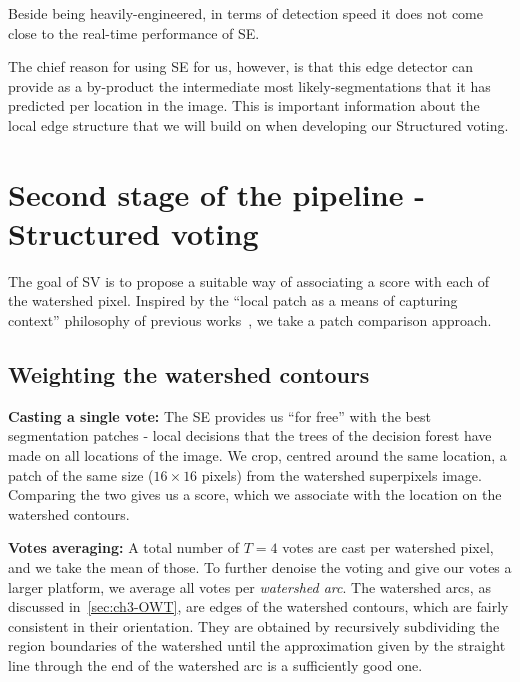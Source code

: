 Beside being heavily-engineered, in terms of detection speed it does not come close to the real-time performance of SE.

The chief reason for using SE for us, however, is that this edge detector can provide as a by-product the intermediate most likely-segmentations that it has predicted per location in the image. This is important information about the local edge structure that we will build on when developing our Structured voting.

\section{Second stage of the pipeline - Structured voting}
\label{sec:ch4-SE-SV-UCM_SV_details}
The goal of SV is to propose a suitable way of associating a score with each of the watershed pixel. Inspired by the ``local patch as a means of capturing context'' philosophy of previous works~\cite{dollar2006supervised,LimZD13,DollarICCV13edges}, we take a patch comparison approach.

\subsection{Weighting the watershed contours} %
\textbf{Casting a single vote:} The SE provides us ``for free'' with the best segmentation patches - local decisions that the trees of the decision forest have made on all locations of the image. We crop, centred around the same location, a patch of the same size ($16\times 16$ pixels) from the watershed superpixels  image. Comparing the two gives us a score, which we associate with the location on the watershed contours.

\textbf{Votes averaging:} A total number of $T=4$ votes are cast per watershed pixel, and we take the mean of those. To further denoise the voting and give our votes a larger platform, %
we average all votes per \textit{watershed arc}. The watershed arcs, as discussed in~\ref{sec:ch3-OWT}, are edges of the watershed contours, which are fairly consistent in their orientation. They are obtained by recursively subdividing the region boundaries of the watershed until the approximation given by the straight line through the end of the watershed arc is a sufficiently good one. %


